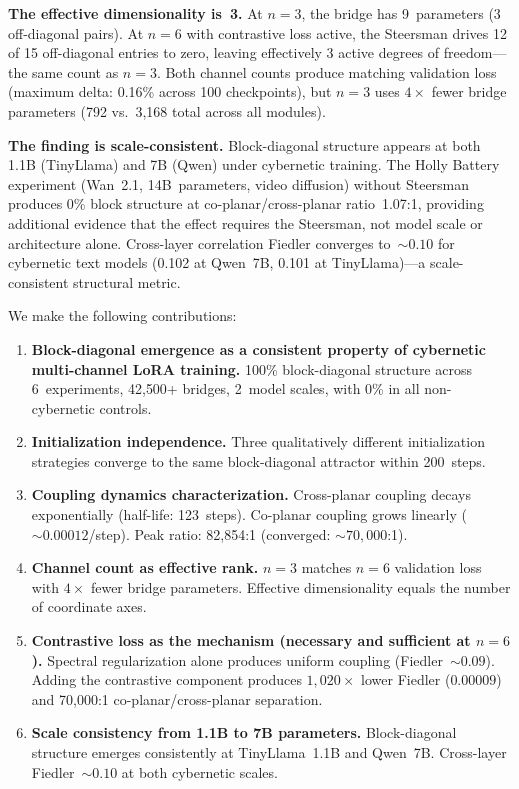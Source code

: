 \documentclass[11pt]{article}
\begin{document}
\textbf{The effective dimensionality is~3.} At $n = 3$, the bridge
has 9~parameters (3 off-diagonal pairs). At $n = 6$ with contrastive
loss active, the Steersman drives 12 of 15 off-diagonal entries to
zero, leaving effectively 3 active degrees of freedom---the same count as
$n = 3$. Both channel counts produce matching validation loss
(maximum delta: 0.16\% across 100 checkpoints), but $n = 3$ uses
$4\times$ fewer bridge parameters (792 vs.\ 3{,}168 total across all
modules).

\textbf{The finding is scale-consistent.} Block-diagonal structure
appears at both 1.1B (TinyLlama) and 7B (Qwen) under cybernetic
training. The Holly Battery experiment (Wan~2.1, 14B~parameters,
video diffusion) without Steersman produces 0\% block structure at
co-planar/cross-planar ratio~1.07:1, providing additional evidence that the effect requires the
Steersman, not model scale or architecture alone.
Cross-layer correlation Fiedler converges to~${\sim}0.10$ for
cybernetic text models (0.102 at Qwen~7B, 0.101 at
TinyLlama)---a scale-consistent structural metric.

We make the following contributions:

\begin{enumerate}
  \item \textbf{Block-diagonal emergence as a consistent property of
    cybernetic multi-channel LoRA training.} 100\% block-diagonal
    structure across 6~experiments, 42{,}500+ bridges, 2~model scales,
    with 0\% in all non-cybernetic controls.
  \item \textbf{Initialization independence.} Three qualitatively
    different initialization strategies converge to the same
    block-diagonal attractor within 200~steps.
  \item \textbf{Coupling dynamics characterization.} Cross-planar
    coupling decays exponentially (half-life: 123~steps). Co-planar
    coupling grows linearly (${\sim}0.00012$/step). Peak ratio:
    82{,}854:1 (converged: ${\sim}70{,}000$:1).
  \item \textbf{Channel count as effective rank.} $n = 3$ matches
    $n = 6$ validation loss with $4\times$ fewer bridge parameters.
    Effective dimensionality equals the number of coordinate axes.
  \item \textbf{Contrastive loss as the mechanism (necessary and
    sufficient at $n = 6$).} Spectral regularization alone produces uniform coupling
    (Fiedler~${\sim}0.09$). Adding the contrastive component produces
    $1{,}020\times$ lower Fiedler ($0.00009$) and 70{,}000:1
    co-planar/cross-planar separation.
  \item \textbf{Scale consistency from 1.1B to 7B parameters.}
    Block-diagonal structure emerges consistently at TinyLlama~1.1B and
    Qwen~7B. Cross-layer Fiedler~${\sim}0.10$ at both cybernetic scales.
\end{enumerate}
\end{document}
